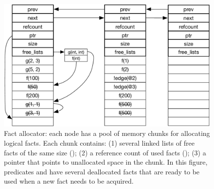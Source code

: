 \begin{figure}[ht]
   \begin{center}
      \includegraphics[width=0.7\linewidth]{figures/implementation/fact_allocator.pdf}
   \end{center}
   \caption{Fact allocator: each node has a pool of memory chunks for allocating
      logical facts. Each chunk contains: (1) several linked lists of free facts
      of the same size (); (2) a reference count of used facts
      (); (3) a  pointer that points to unallocated
      space in the chunk. In this figure, predicates  and  have
   several deallocated facts that are ready to be used when a new fact needs to
be acquired.}
   \label{fig:implementation:fact_allocator}
\end{figure}
